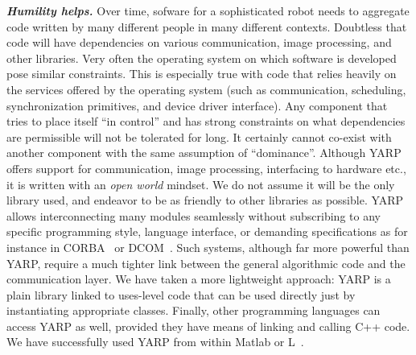 \textit{\textbf{Humility helps.}}
Over time, sofware for a sophisticated robot needs to 
aggregate code written by many different people in many
different contexts.  Doubtless that code will have
dependencies on various communication, image processing,
and other libraries. Very often the operating system on which
software is developed pose similar constraints. This is especially
true with code that relies heavily on the services offered by the 
operating system (such as communication, scheduling, synchronization primitives, 
and device driver interface).
%
Any component that tries to place itself ``in control'' and has strong
constraints on what dependencies are permissible will not be tolerated
for long.  It certainly cannot co-exist with another component
with the same assumption of ``dominance''. 
Although YARP offers support for communication, image processing,
interfacing to hardware etc., it is written with an {\em open world}
mindset.  We do not assume it will be the only library used, and
endeavor to be as friendly to other libraries as possible.
%
YARP allows interconnecting many modules seamlessly without subscribing
to any specific programming style, language interface, 
or demanding specifications as for instance in CORBA~\cite{vinoski97corba}
or DCOM~\cite{dcom}. Such systems, although far more powerful than YARP,
require a much tighter link between the general algorithmic code and the 
communication layer.
We have taken a more lightweight approach: YARP is a plain library linked
to uses-level code that can be used directly just by instantiating appropriate classes.
%
%
%
%
%
%
%
%
Finally, other programming languages can access YARP as well, provided they
have means of linking and calling C++ code. We have successfully used
YARP from within Matlab or L~\cite{brooks90behavior}.



